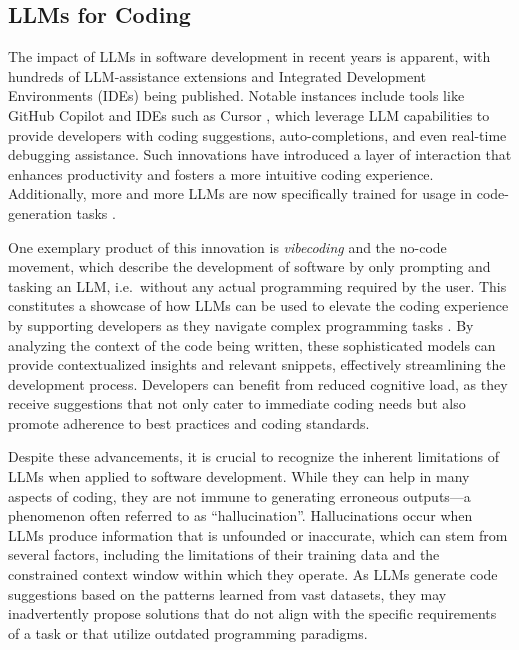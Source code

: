 \documentclass[
  a4paper,
]{scrreprt}
\theoremstyle{definition}
\theoremstyle{remark}
\begin{document}
\subsection{LLMs for Coding}\label{sec-llm-coding}

The impact of LLMs in software development in recent years is apparent,
with hundreds of LLM-assistance extensions and Integrated Development
Environments (IDEs) being published. Notable instances include tools
like GitHub Copilot and IDEs such as Cursor \autocite{cursor,ghcopilot},
which leverage LLM capabilities to provide developers with coding
suggestions, auto-completions, and even real-time debugging assistance.
Such innovations have introduced a layer of interaction that enhances
productivity and fosters a more intuitive coding experience.
Additionally, more and more LLMs are now specifically trained for usage
in code-generation tasks
\autocite{nijkamp2023a,nijkamp2023,openai2025a}.

One exemplary product of this innovation is \emph{vibecoding} and the
no-code movement, which describe the development of software by only
prompting and tasking an LLM, i.e.~without any actual programming
required by the user. This constitutes a showcase of how LLMs can be
used to elevate the coding experience by supporting developers as they
navigate complex programming tasks \autocite{sarkar2025}. By analyzing
the context of the code being written, these sophisticated models can
provide contextualized insights and relevant snippets, effectively
streamlining the development process. Developers can benefit from
reduced cognitive load, as they receive suggestions that not only cater
to immediate coding needs but also promote adherence to best practices
and coding standards.

Despite these advancements, it is crucial to recognize the inherent
limitations of LLMs when applied to software development. While they can
help in many aspects of coding, they are not immune to generating
erroneous outputs---a phenomenon often referred to as ``hallucination''.
Hallucinations occur when LLMs produce information that is unfounded or
inaccurate, which can stem from several factors, including the
limitations of their training data and the constrained context window
within which they operate. As LLMs generate code suggestions based on
the patterns learned from vast datasets, they may inadvertently propose
solutions that do not align with the specific requirements of a task or
that utilize outdated programming paradigms.
\end{document}
